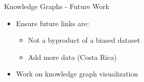 \begin{frame}{Knowledge Graphs - Future Work}
    \begin{itemize}
        \item Ensure future links are:
        \begin{itemize}
            \item Not a byproduct of a biased dataset
            \item Add more data (Costa Rica)
        \end{itemize}
        \item Work on knowledge graph visualization
    \end{itemize}
\end{frame}

